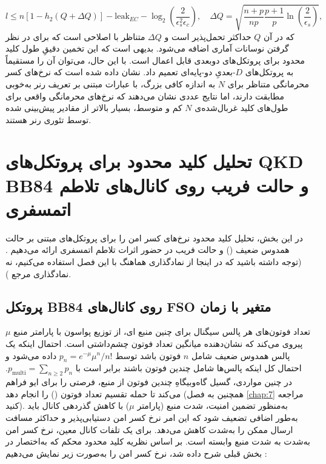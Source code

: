 \begin{equation}
	l \leq n [1 - h_2(Q + \Delta Q)] - \text{leak}_{EC} - \log_2 \left( \frac{2}{\epsilon_s^2 \epsilon_c} \right), \quad \Delta Q = \sqrt{\frac{n + p}{np} \frac{p + 1}{p} \ln \left( \frac{2}{\epsilon_s} \right)},
	\label{eq:8-47}
\end{equation}
که در آن $Q$ حداکثر  تحمل‌پذیر است و $\Delta Q$ متناظر با اصلاحی است که برای در نظر گرفتن نوسانات آماری اضافه می‌شود. بدیهی است که این تخمین دقیقِ طول کلید محدود برای پروتکل‌های دو‌بعدی قابل اعمال است. با این حال، می‌توان آن را مستقیماً به پروتکل‌های $D$-بعدیِ دو-پایه‌ای تعمیم داد. نشان داده شده است که نرخ‌های کسر محرمانگی متناظر برای $N$ به اندازه کافی بزرگ، با عبارات مبتنی بر تعریف رنر به‌خوبی مطابقت دارند، اما نتایج عددی نشان می‌دهند که نرخ‌های محرمانگی واقعی برای طول‌های کلید غربال‌شده‌ی $N$ کم و متوسط، بسیار بالاتر از مقادیر پیش‌بینی شده توسط تئوری رنر هستند.

\section{تحلیل کلید محدود برای پروتکل‌های QKD BB84 و حالت فریب روی کانال‌های تلاطم اتمسفری}
\label{sec:8-3}
در این بخش، تحلیل کلید محدود نرخ‌های کسر امن را برای پروتکل‌های  مبتنی بر حالت همدوس ضعیف () و حالت فریب در حضور اثرات تلاطم اتمسفری ارائه می‌دهیم \cite{8-21}. (توجه داشته باشید که در اینجا از نمادگذاری هماهنگ با این فصل استفاده می‌کنیم، نه نمادگذاری مرجع \cite{8-21}).





\subsection{پروتکل BB84 روی کانال‌های FSO متغیر با زمان}
\label{subsec:8-3-1}

تعداد فوتون‌های هر پالس سیگنال برای چنین منبع ای، از توزیع پواسون با پارامتر منبع $\mu$ پیروی می‌کند که نشان‌دهنده میانگین تعداد فوتون چشم‌داشتی است. احتمال اینکه یک پالس همدوس ضعیف شامل $n$ فوتون باشد توسط $p_n = e^{-\mu} \mu^n / n!$ داده می‌شود و احتمال کل اینکه پالس‌ها شامل چندین فوتون باشند برابر است با $p_{\text{multi}} = \sum_{n \geq 2} p_n$. در چنین مواردی، گسیل گاه‌وبیگاهِ چندین فوتون از منبع، فرصتی را برای ایو فراهم می‌کند تا حمله تقسیم تعداد فوتون () را انجام دهد (همچنین به فصل \ref{chap:7} مراجعه کنید). به‌منظور تضمین امنیت، شدت منبع (پارامتر $\mu$) با کاهش گذردهی کانال باید به‌طور اضافی تضعیف شود که این امر نرخ کسر امن دستیابی‌پذیر و حداکثر مسافت ارسال ممکن را به‌شدت کاهش می‌دهد. برای یک تلفات کانال معین، نرخ کسر امن به‌شدت به شدت منبع وابسته است. بر اساس نظریه کلید محدود محکم \cite{8-41} که به‌اختصار در بخش قبلی شرح داده شد، نرخ کسر امن را به‌صورت زیر نمایش می‌دهیم \cite{8-21}:


